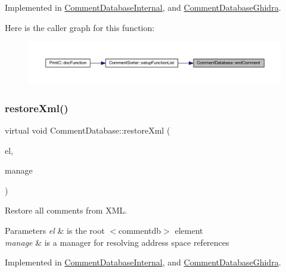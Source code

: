 Implemented in \mbox{\hyperlink{class_comment_database_internal_a67ef8bcfd5778dd45acfd533ffd56189}{Comment\+Database\+Internal}}, and \mbox{\hyperlink{class_comment_database_ghidra_aab66e37f898fbd4f15dedfe11d024b9c}{Comment\+Database\+Ghidra}}.

Here is the caller graph for this function\+:
\nopagebreak
\begin{figure}[H]
\begin{center}
\leavevmode
\includegraphics[width=350pt]{class_comment_database_a51e0634dc24c921507426298910336f4_icgraph}
\end{center}
\end{figure}
\mbox{\label{class_comment_database_a21e8b98e7f4276e239f6b2ea59191ded}} 
\subsubsection{\texorpdfstring{restoreXml()}{restoreXml()}}
{\footnotesize\ttfamily virtual void Comment\+Database\+::restore\+Xml (\begin{DoxyParamCaption}\item[{const \mbox{\hyperlink{class_element}{Element}} $\ast$}]{el,  }\item[{const \mbox{\hyperlink{class_addr_space_manager}{Addr\+Space\+Manager}} $\ast$}]{manage }\end{DoxyParamCaption})\hspace{0.3cm}{\ttfamily [pure virtual]}}



Restore all comments from X\+ML. 


\begin{DoxyParams}{Parameters}
{\em el} & is the root $<$commentdb$>$ element \\
\hline
{\em manage} & is a manager for resolving address space references \\
\hline
\end{DoxyParams}


Implemented in \mbox{\hyperlink{class_comment_database_internal_a461a9fbe7e898e251637bd605d5758e2}{Comment\+Database\+Internal}}, and \mbox{\hyperlink{class_comment_database_ghidra_ab787aca7833ed057ba06d82fc258e738}{Comment\+Database\+Ghidra}}.

